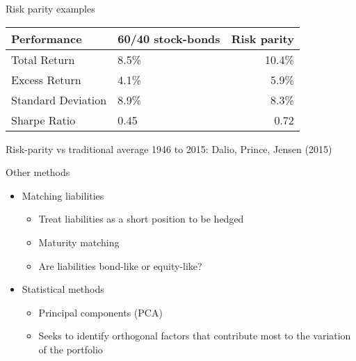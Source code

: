 \documentclass[14pt,xcolor=pdftex,dvipsnames,table]{beamer}\usepackage[]{graphicx}\usepackage[]{color}
\begin{document}
\begin{frame}{Risk parity examples}
\begin{table}
\begin{center}
\begin{tabular}{l  p{2.5cm} r}
\textbf{Performance} & \textbf{60/40 stock-bonds} & \textbf{Risk parity}\\
\hline
Total Return & 8.5\% & 10.4\% \\
Excess Return & 4.1\% & 5.9\%\\
Standard Deviation & 8.9\% & 8.3\% \\
Sharpe Ratio & 0.45 & 0.72
\end{tabular}
\end{center}
\end{table}
Risk-parity vs traditional average 1946 to 2015: Dalio, Prince, Jensen (2015)
\end{frame}

\begin{frame}{Other methods}
\begin{itemize}[<+-| alert@+>]
\pause
\item Matching liabilities 
\begin{itemize}
\item Treat liabilities as a short position to be hedged
\item Maturity matching
\item Are liabilities bond-like or equity-like?
\end{itemize}
\item Statistical methods
\begin{itemize}
\item Principal components (PCA)
\item Seeks to identify orthogonal factors that contribute most to the variation of the portfolio
\end{itemize}
\end{itemize}
\end{frame}

%
\end{document}
